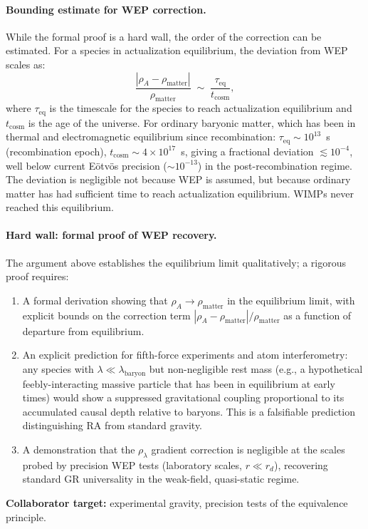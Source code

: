 \documentclass[11pt,a4paper]{article}
\theoremstyle{plain}
\theoremstyle{definition}
\theoremstyle{remark}
\begin{document}
\paragraph{Bounding estimate for WEP correction.}
While the formal proof is a hard wall, the order of the correction
can be estimated. For a species in actualization equilibrium, the
deviation from WEP scales as:
\begin{equation}
  \frac{|\rho_A - \rho_{\mathrm{matter}}|}{\rho_{\mathrm{matter}}}
  \;\sim\; \frac{\tau_{\mathrm{eq}}}{t_{\mathrm{cosm}}},
  \label{eq:wep_bound}
\end{equation}
where $\tau_{\mathrm{eq}}$ is the timescale for the species to reach
actualization equilibrium and $t_{\mathrm{cosm}}$ is the age of the
universe. For ordinary baryonic matter, which has been in thermal and
electromagnetic equilibrium since recombination:
$\tau_{\mathrm{eq}} \sim 10^{13}$~s (recombination epoch),
$t_{\mathrm{cosm}} \sim 4 \times 10^{17}$~s, giving a fractional
deviation $\lesssim 10^{-4}$, well below current E\"{o}tv\"{o}s
precision ($\sim 10^{-13}$) in the post-recombination regime.
The deviation is negligible not because WEP is assumed, but because
ordinary matter has had sufficient time to reach actualization
equilibrium. WIMPs never reached this equilibrium.

\paragraph{Hard wall: formal proof of WEP recovery.}
The argument above establishes the equilibrium limit qualitatively;
a rigorous proof requires:
\begin{enumerate}[noitemsep]
  \item A formal derivation showing that $\rho_A \to \rho_{\mathrm{matter}}$ in
  the equilibrium limit, with explicit bounds on the correction term
  $|\rho_A - \rho_{\mathrm{matter}}|/\rho_{\mathrm{matter}}$ as a function of
  departure from equilibrium.
  \item An explicit prediction for fifth-force experiments and atom interferometry:
  any species with $\lambda \ll \lambda_{\mathrm{baryon}}$ but non-negligible rest
  mass (e.g., a hypothetical feebly-interacting massive particle that has been in
  equilibrium at early times) would show a suppressed gravitational coupling
  proportional to its accumulated causal depth relative to baryons. This is a
  falsifiable prediction distinguishing RA from standard gravity.
  \item A demonstration that the $\rho_\lambda$ gradient correction is negligible
  at the scales probed by precision WEP tests (laboratory scales, $r \ll r_d$),
  recovering standard GR universality in the weak-field, quasi-static regime.
\end{enumerate}
\textbf{Collaborator target:} experimental gravity, precision tests of the
equivalence principle.
\end{document}
